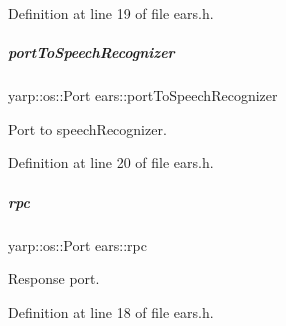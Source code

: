 Definition at line 19 of file ears.\+h.

\mbox{\label{group__ears_ac467a7a8fdca6c1c9d17f37a5e149e39}} 
\subparagraph{\texorpdfstring{port\+To\+Speech\+Recognizer}{portToSpeechRecognizer}}
{\footnotesize\ttfamily yarp\+::os\+::\+Port ears\+::port\+To\+Speech\+Recognizer\hspace{0.3cm}{\ttfamily [protected]}}



Port to speech\+Recognizer. 



Definition at line 20 of file ears.\+h.

\mbox{\label{group__ears_a34c5b9cddeaea5b4c086948017d061fa}} 
\subparagraph{\texorpdfstring{rpc}{rpc}}
{\footnotesize\ttfamily yarp\+::os\+::\+Port ears\+::rpc\hspace{0.3cm}{\ttfamily [protected]}}



Response port. 



Definition at line 18 of file ears.\+h.

